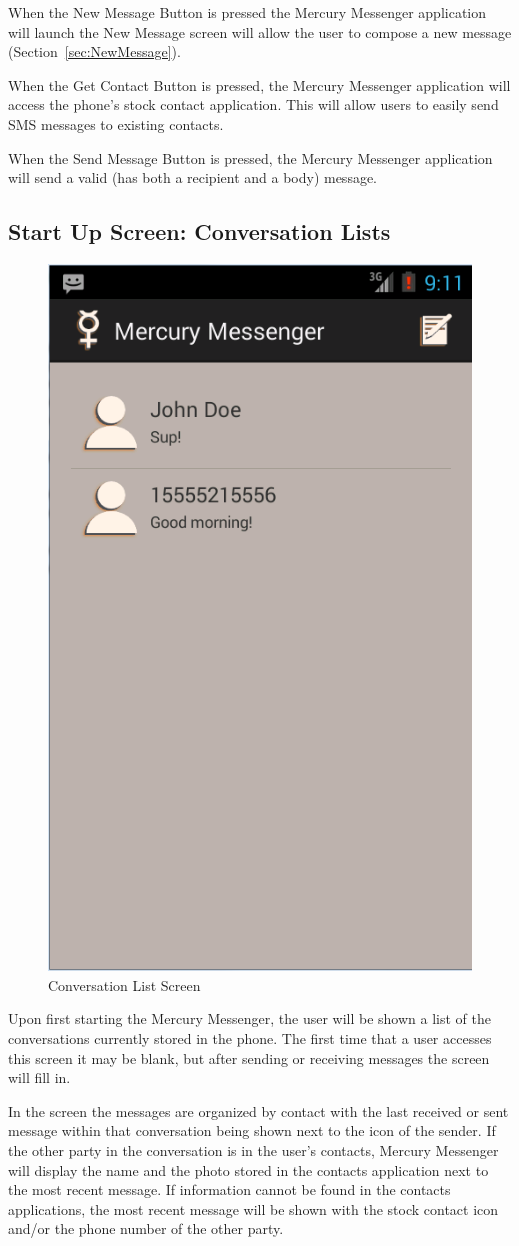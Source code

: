 \documentclass{article}
\begin{document}
\par When the New Message Button is pressed the Mercury Messenger application will launch the New Message screen  will allow the user to compose a new message (Section~\ref{sec:NewMessage}).


\par When the Get Contact Button is pressed, the Mercury Messenger application will access the phone's stock contact application. This will allow users to easily send SMS messages to existing contacts.

\par When the Send Message Button is pressed, the Mercury Messenger application will send a valid (has both a recipient and a body) message.




\subsection{Start Up Screen: Conversation Lists}
\label{sec:ConvoList}
\begin{figure}[h!]
\centering
\includegraphics[width=.25\textwidth]{"./Screen_shots/Main_Screen"}{}
\caption{Conversation List Screen}

\end{figure}



\par Upon first starting the Mercury Messenger, the user will be shown a list of the conversations currently stored in the phone. The first time that a user accesses this screen it may be blank, but after sending or receiving messages the screen will fill in.

\par In the screen the messages are organized by contact with the last received or sent message within that conversation being shown next to the icon of the sender. If the other party in the conversation is in the user's contacts, Mercury Messenger will display the name and the photo stored in the contacts application next to the most recent message.
If information cannot be found in the contacts applications, the most recent message will be shown with the stock contact icon and/or the phone number of the other party.
\end{document}
